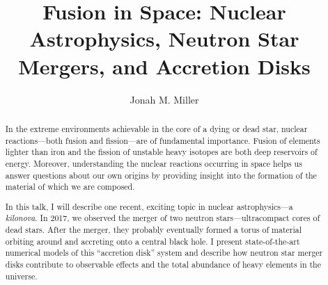 \documentclass[letter,nofootinbib,superscriptaddress,twocolumn]{revtex4-1}
\begin{document}
\title{Fusion in Space: Nuclear Astrophysics, Neutron Star Mergers, and Accretion Disks}

\author{Jonah M. Miller}

\begin{abstract}
  In the extreme environments achievable in the core of a dying or
  dead star, nuclear reactions---both fusion and fission---are of
  fundamental importance. Fusion of elements lighter than iron and the
  fission of unstable heavy isotopes are both deep reservoirs of
  energy. Moreover, understanding the nuclear reactions occurring in
  space helps us answer questions about our own origins by providing
  insight into the formation of the material of which we are composed.

  In this talk, I will describe one recent, exciting topic in nuclear
  astrophysics---a \textit{kilonova}. In 2017, we observed the merger
  of two neutron stars---ultracompact cores of dead stars. After the
  merger, they probably eventually formed a torus of material orbiting
  around and accreting onto a central black hole. I present
  state-of-the-art numerical models of this ``accretion disk'' system
  and describe how neutron star merger disks contribute to observable
  effects and the total abundance of heavy elements in the universe.
\end{abstract}

\maketitle
\end{document}
